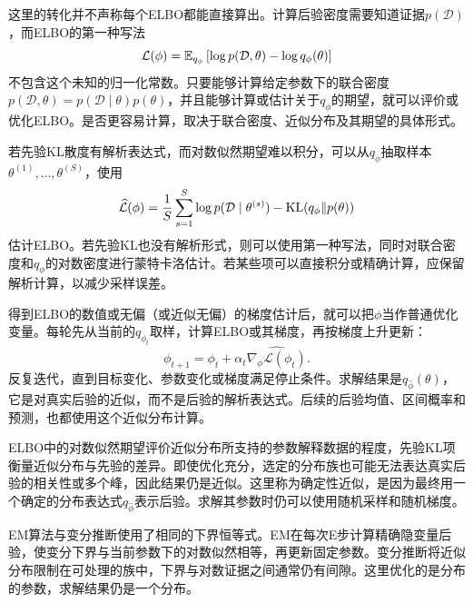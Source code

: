 这里的转化并不声称每个ELBO都能直接算出。计算后验密度需要知道证据$p(\mathcal D)$，而ELBO的第一种写法
\begin{equation}
 \mathcal L(\phi)=\mathbb{E}_{q_\phi}
 \left[\log p(\mathcal D,\theta)-\log q_\phi(\theta)\right]
 \end{equation}
不包含这个未知的归一化常数。只要能够计算给定参数下的联合密度$p(\mathcal D,\theta)=p(\mathcal D\mid\theta)p(\theta)$，并且能够计算或估计关于$q_\phi$的期望，就可以评价或优化ELBO。是否更容易计算，取决于联合密度、近似分布及其期望的具体形式。

若先验KL散度有解析表达式，而对数似然期望难以积分，可以从$q_\phi$抽取样本$\theta^{(1)},\ldots,\theta^{(S)}$，使用
\begin{equation}
 \widehat{\mathcal L}(\phi)
 =\frac1S\sum_{s=1}^S\log p(\mathcal D\mid\theta^{(s)})
 -\operatorname{KL}(q_\phi\|p(\theta))
 \end{equation}
估计ELBO。若先验KL也没有解析形式，则可以使用第一种写法，同时对联合密度和$q_\phi$的对数密度进行蒙特卡洛估计。若某些项可以直接积分或精确计算，应保留解析计算，以减少采样误差。

得到ELBO的数值或无偏（或近似无偏）的梯度估计后，就可以把$\phi$当作普通优化变量。每轮先从当前的$q_{\phi_t}$取样，计算ELBO或其梯度，再按梯度上升更新：
\begin{equation}
 \phi_{t+1}=\phi_t+\alpha_t\widehat{\nabla_\phi\mathcal L(\phi_t)}.
\end{equation}
反复迭代，直到目标变化、参数变化或梯度满足停止条件。求解结果是$q_{\hat\phi}(\theta)$，它是对真实后验的近似，而不是后验的解析表达式。后续的后验均值、区间概率和预测，也都使用这个近似分布计算。

ELBO中的对数似然期望评价近似分布所支持的参数解释数据的程度，先验KL项衡量近似分布与先验的差异。即使优化充分，选定的分布族也可能无法表达真实后验的相关性或多个峰，因此结果仍是近似。这里称为确定性近似，是因为最终用一个确定的分布表达式$q_{\hat\phi}$表示后验。求解其参数时仍可以使用随机采样和随机梯度。

EM算法与变分推断使用了相同的下界恒等式。EM在每次E步计算精确隐变量后验，使变分下界与当前参数下的对数似然相等，再更新固定参数。变分推断将近似分布限制在可处理的族中，下界与对数证据之间通常仍有间隙。这里优化的是分布的参数，求解结果仍是一个分布。

